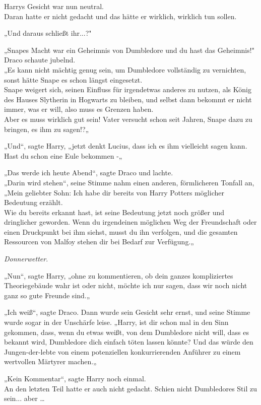 {Harrys Gesicht war nun neutral.\\ Daran hatte er nicht gedacht und das hätte er wirklich, wirklich tun sollen.

„Und daraus schließt ihr...?"

„Snapes Macht war ein Geheimnis von Dumbledore und du hast das Geheimnis!"\\ Draco schaute jubelnd.\\ „Es kann nicht mächtig genug sein, um Dumbledore vollständig zu vernichten, sonst hätte Snape es schon längst eingesetzt.\\ Snape weigert sich, seinen Einfluss für irgendetwas anderes zu nutzen, als König des Hauses Slytherin in Hogwarts zu bleiben, und selbst dann bekommt er nicht immer, was er will, also muss es Grenzen haben.\\ Aber es muss wirklich gut sein! Vater versucht schon seit Jahren, Snape dazu zu bringen, es ihm zu sagen!?„

„Und“, sagte Harry, „jetzt denkt Lucius, dass ich es ihm vielleicht sagen kann. Hast du schon eine Eule bekommen -„

„Das werde ich heute Abend“, sagte Draco und lachte.\\ „Darin wird stehen“, seine Stimme nahm einen anderen, förmlicheren Tonfall an,\\ „Mein geliebter Sohn: Ich habe dir bereits von Harry Potters möglicher Bedeutung erzählt.\\ Wie du bereits erkannt hast, ist seine Bedeutung jetzt noch größer und dringlicher geworden. Wenn du irgendeinen möglichen Weg der Freundschaft oder einen Druckpunkt bei ihm siehst, musst du ihn verfolgen, und die gesamten Ressourcen von Malfoy stehen dir bei Bedarf zur Verfügung.„

\emph{Donnerwetter}.

„Nun“, sagte Harry, „ohne zu kommentieren, ob dein ganzes kompliziertes Theoriegebäude wahr ist oder nicht, möchte ich nur sagen, dass wir noch nicht ganz so gute Freunde sind.„

„Ich weiß“, sagte Draco. Dann wurde sein Gesicht sehr ernst, und seine Stimme wurde sogar in der Unschärfe leise. „Harry, ist dir schon mal in den Sinn gekommen, dass, wenn du etwas weißt, von dem Dumbledore nicht will, dass es bekannt wird, Dumbledore dich einfach töten lassen könnte? Und das würde den Jungen-der-lebte von einem potenziellen konkurrierenden Anführer zu einem wertvollen Märtyrer machen.„

„Kein Kommentar“, sagte Harry noch einmal.\\ An den letzten Teil hatte er auch nicht gedacht. Schien nicht Dumbledores Stil zu sein... aber …

}
